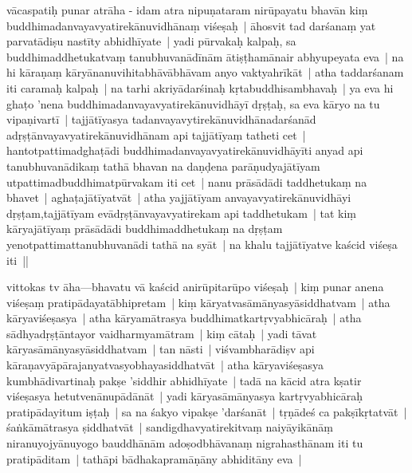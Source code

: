 \documentclass[article,12pt,a4paper]{memoir}
\newcommand{\unclear}[1]{($^{?}$#1)}
\begin{document}
	  \pstart vācaspatiḥ punar atrāha - idam atra nipuṇataram nirūpayatu bhavān kiṃ buddhimadanvayavyatirekānuvidhānaṃ viśeṣaḥ | āhosvit tad darśanaṃ yat parvatādiṣu nastīty abhidhīyate | yadi pūrvakaḥ kalpaḥ, sa buddhimaddhetukatvaṃ tanubhuvanādīnām ātiṣṭhamānair abhyupeyata eva | na hi kāraṇaṃ kāryānanuvihitabhāvābhāvam anyo vaktyahrīkāt | atha taddarśanam iti caramaḥ kalpaḥ | na tarhi akriyādarśinaḥ kṛtabuddhisambhavaḥ | ya eva hi ghaṭo 'nena buddhimadanvayavyatirekānuvidhāyī dṛṣṭaḥ, sa eva kāryo na tu vipaṇivartī | tajjātīyasya tadanvayavytirekānuvidhānadarśanād adṛṣṭānvayavyatirekānuvidhānam api tajjātīyaṃ tatheti cet | hantotpattimadghaṭādi buddhimadanvayavyatirekānuvidhāyīti anyad api tanubhuvanādikaṃ tathā bhavan na daṇḍena parāṇudya\leavevmode{}\label{RNAms-29b}\edtext{te | ghaṭa}{\Afootnote{\unclear{ghaṭa} \cite{RNAms} ; te | ghaṭa \cite{s}   {\rmlatinfont [App type: var]}}}jātīyam utpattimadbuddhimatpūrvakam iti cet | nanu prāsādādi taddhetukaṃ na bhavet | aghaṭajātīyatvāt | atha yajjātīyam anvayavyatirekānuvidhāyi dṛṣṭam,tajjātīyam evādṛṣṭānvayavyatirekam api taddhetukam | tat kiṃ kāryajātīyaṃ prāsādādi buddhimaddhetukaṃ na dṛṣṭam yenotpattimattanubhuvanādi tathā na syāt | na khalu tajjātīyatve kaścid viśeṣa iti ||
	\pend
      

	  \pstart {}\label{sarit__ratnakīrtinibandhāvali__141640}vittokas tv āha—bhavatu vā kaścid anirūpitarūpo viśeṣaḥ | kiṃ punar anena viśeṣaṃ pratipādayatābhipretam | kiṃ kāryatvasāmānyasyāsiddhatvam | atha kāryaviśeṣasya | atha kāryamātrasya buddhimatkartṛvyabhicāraḥ | atha sādhyadṛṣṭāntayor vaidharmyamātram | kiṃ cātaḥ | yadi tāvat kāryasāmānyasyāsiddhatvam | tan nāsti | viśvambharādiṣv api kāraṇavyāpārajanyatvasyobhayasiddhatvāt | atha kāryaviśeṣasya kumbhādivartinaḥ pakṣe 'siddhir abhidhīyate | tadā na kācid atra kṣatir viśeṣasya hetutvenānupādānāt | yadi kāryasāmānyasya kartṛvyabhicāraḥ pratipādayitum iṣṭaḥ | sa na śakyo vipakṣe 'darśanāt | tṛṇādeś ca pakṣīkṛtatvāt | śaṅkāmātrasya ṣiddhatvāt | sandigdhavyatirekitvaṃ naiyāyikānāṃ niranuyojyānuyogo bauddhānām adoṣodbhāvanaṃ nigrahasthānam iti tu pratipāditam | tathāpi bādhakapramāṇāny abhiditāny eva |
	\pend
      
\end{document}

